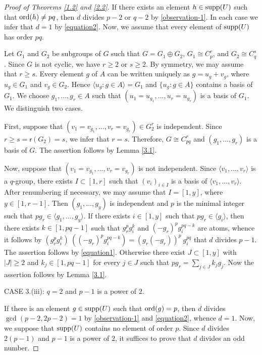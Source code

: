 \documentclass[a4paper,10pt]{amsart}
\theoremstyle{plain}
\theoremstyle{definition}
\numberwithin{equation}{section}
\begin{document}
\begin{proof}[Proof of Theorems \ref{1.2} and \ref{2.2}]
	 If there exists an element $h\in \operatorname{supp} (U)$ such that $\operatorname{ord}(h)\neq pq$, then $d$ divides $p-2$ or $q-2$ by \eqref{observation-1}.  In each case we infer that  $d=1$ by \eqref{equation2}.
	Now, we  assume that every element of $\operatorname{supp} (U)$ has order $pq$.
	
	
	Let $G_1$ and $G_2$ be subgroups of $G$ such that $G=G_1\oplus G_2$,  $G_1 \cong C_p^{r} $, and $G_2\cong C_{q}^{s}$. Since $G$ is not cyclic, we have $r\ge 2$ or $s\ge 2$. By symmetry, we may assume that  $r\ge s$.  Every element $g$ of $A$ can be written uniquely as $g=u_g+v_g$, where $u_g\in G_1$ and $v_g\in G_2$. Hence $\langle u_g\colon g\in A\rangle=G_1$ and $\{u_g\colon  g\in A\}$ contains a basis of $G_1$. We choose $g_1, \ldots, g_{r}\in A$ such that $(u_1=u_{g_1}, \ldots, u_{r}=u_{g_{r}})$ is a basis of $G_1$. We distinguish two cases.
	
	First, suppose that $(v_1=v_{g_1},\ldots, v_r=v_{g_r}) \in G_2^r$ is  independent. Since $r\ge s = \mathsf r(G_2)=s$, we infer that $r=s$.
	Therefore, $G\cong C_{pq}^r$ and $(g_1,\ldots, g_r)$ is a basis of $G$. The assertion follows by Lemma \ref{3.1}.
	
	
	Now, suppose that $(v_1=v_{g_1},\ldots, v_r=v_{g_r})$ is  not independent. Since $\langle v_1, \ldots, v_r\rangle$ is a $q$-group, there exists $I\subset [1,r]$ such that $(v_i)_{i\in I}$ is a basis of $\langle v_1, \ldots, v_r\rangle$. After renumbering if necessary, we may assume that $I=[1,y]$, where $y\in [1,r-1]$. Then $(g_1, \ldots, g_y)$ is independent and $p$ is the minimal integer such that $pg_r\in \langle g_1,\ldots, g_y\rangle$. If there exists $i\in [1,y]$ such that $pg_r\in \langle g_i\rangle$, then there exists $k\in [1, pq-1]$ such that $g_r^pg_i^k$ and $(-g_r)^pg_i^{pq-k}$ are atoms, whence it follows by $(g_r^pg_i^k)\ ((-g_r)^pg_i^{pq-k})=(g_r(-g_r))^p\ g_i^{pq}$ that $d$ divides $p-1$. The assertion follows by \eqref{equation1}. Otherwise there exist $J\subset [1,y]$ with $|J|\ge 2$ and $k_j\in [1, pq-1]$ for every $j\in J$ such that $pg_r=\sum_{j\in J}k_jg_j$.
	Now the assertion follows by Lemma \ref{3.1}.

\medskip
\noindent
CASE 3.(iii):  $q=2$ and $p-1$ is a power of $2$.


If there is an element $g \in \operatorname{supp}(U)$ such that $\operatorname{ord} (g) = p$, then $d$ divides $\gcd(p-2, 2p-2)=1$ by \eqref{observation-1} and \eqref{equation2}, whence $d=1$.
Now, we suppose that
$\operatorname{supp}(U)$ contains no element of order $p$.  Since $d$ divides $2(p-1)$ and $p-1$ is a power of $2$, it suffices to prove that $d$ divides an odd number.


\end{proof}
\end{document}
